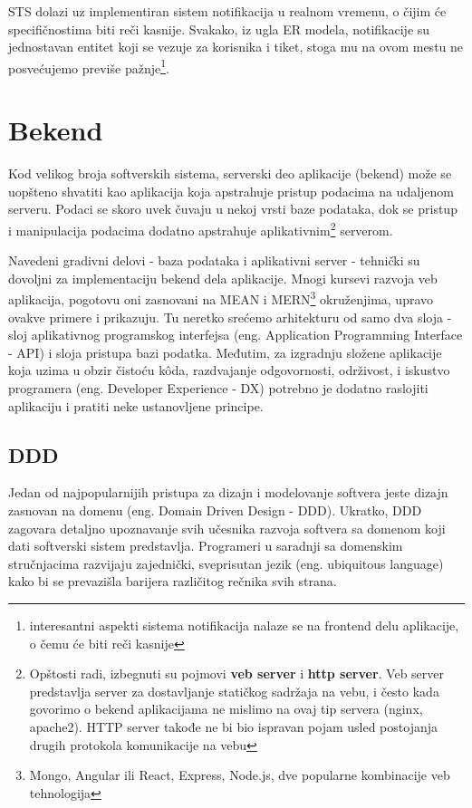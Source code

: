 \documentclass[12pt,oneside]{memoir}
\begin{document}
STS dolazi uz implementiran sistem notifikacija u realnom vremenu, o čijim će specifičnostima biti reči kasnije. Svakako, iz ugla ER modela, notifikacije su jednostavan entitet koji se vezuje za korisnika i tiket, stoga mu na ovom mestu ne posvećujemo previše pažnje\footnote{interesantni aspekti sistema notifikacija nalaze se na frontend delu aplikacije, o čemu će biti reči kasnije}.




\chapter{Bekend}
Kod velikog broja softverskih sistema, serverski deo aplikacije (bekend) može se uopšteno shvatiti kao aplikacija koja apstrahuje pristup podacima na udaljenom serveru. Podaci se skoro uvek čuvaju u nekoj vrsti baze podataka, dok se pristup i manipulacija podacima dodatno apstrahuje aplikativnim\footnote{Opštosti radi, izbegnuti su pojmovi \textbf{veb server} i \textbf{http server}. Veb server predstavlja server za dostavljanje statičkog sadržaja na vebu, i često kada govorimo o bekend aplikacijama ne mislimo na ovaj tip servera (nginx, apache2). HTTP server takođe ne bi bio ispravan pojam usled postojanja drugih protokola komunikacije na vebu} serverom.

Navedeni gradivni delovi - baza podataka i aplikativni server - tehnički su dovoljni za implementaciju bekend dela aplikacije. Mnogi kursevi razvoja veb aplikacija, pogotovu oni zasnovani na MEAN i MERN\footnote{Mongo, Angular ili React, Express, Node.js, dve popularne kombinacije veb tehnologija} okruženjima, upravo ovakve primere i prikazuju. Tu neretko srećemo arhitekturu od samo dva sloja - sloj aplikativnog programskog interfejsa (eng. Application Programming Interface - API) i sloja pristupa bazi podatka. Međutim, za izgradnju složene aplikacije koja uzima u obzir čistoću k\^{o}da, razdvajanje odgovornosti, održivost, i iskustvo programera (eng. Developer Experience - DX) potrebno je dodatno raslojiti aplikaciju i pratiti neke ustanovljene principe.


\section{DDD}
\label{sec:dddsection}
Jedan od najpopularnijih pristupa za dizajn i modelovanje softvera jeste dizajn zasnovan na domenu (eng. Domain Driven Design - DDD). Ukratko, DDD zagovara detaljno upoznavanje svih učesnika razvoja softvera sa domenom koji dati softverski sistem predstavlja. Programeri u saradnji sa domenskim stručnjacima razvijaju zajednički, sveprisutan jezik (eng. ubiquitous language) kako bi se prevazišla barijera različitog rečnika svih strana. \cite{dddq}
\end{document}
